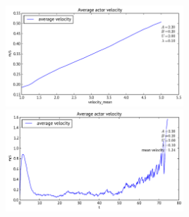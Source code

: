 \includegraphics[width=0.5\textwidth]{Figures/plots/square_room-velocity-aggr-velocity_mean.pdf}
\includegraphics[width=0.5\textwidth]{Figures/plots/square_room-velocity.pdf}
